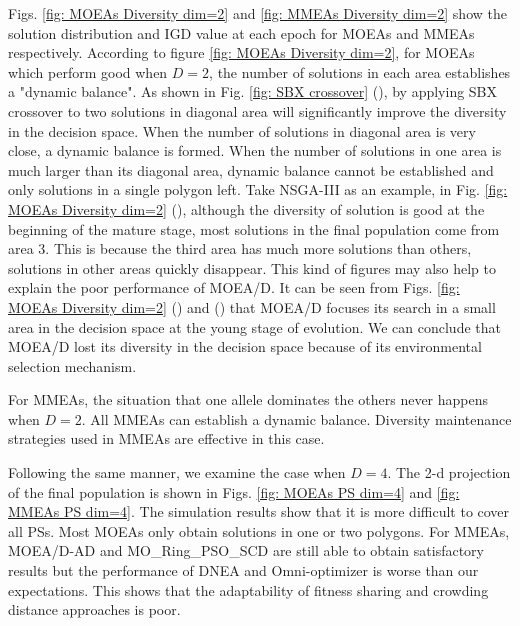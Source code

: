 \documentclass[conference]{IEEEtran}
\begin{document}
Figs. \ref{fig: MOEAs Diversity dim=2} and \ref{fig: MMEAs Diversity dim=2} show the solution distribution and IGD value at each epoch for MOEAs and MMEAs respectively. According to figure \ref{fig: MOEAs Diversity dim=2}, for MOEAs which perform good when $D=2$, the number of solutions in each area establishes a "dynamic balance". As shown in Fig. \ref{fig: SBX crossover} (), by applying SBX crossover to two solutions in diagonal area will significantly improve the diversity in the decision space. When the number of solutions in diagonal area is very close, a dynamic balance is formed. When the number of solutions in one area is much larger than its diagonal area, dynamic balance cannot be established and only solutions in a single polygon left. Take NSGA-III as an example, in Fig. \ref{fig: MOEAs Diversity dim=2} (), although the diversity of solution is good at the beginning of the mature stage, most solutions in the final population come from area 3. This is because the third area has much more solutions than others, solutions in other areas quickly disappear. This kind of figures may also help to explain the poor performance of MOEA/D. It can be seen from Figs. \ref{fig: MOEAs Diversity dim=2} () and () that MOEA/D focuses its search in a small area in the decision space at the young stage of evolution. We can conclude that MOEA/D lost its diversity in the decision space because of its environmental selection mechanism.

For MMEAs, the situation that one allele dominates the others never happens when $D=2$. All MMEAs can establish a dynamic balance. Diversity maintenance strategies used in MMEAs are effective in this case.

Following the same manner, we examine the case when $D=4$. The 2-d projection of the final population is shown in Figs. \ref{fig: MOEAs PS dim=4} and \ref{fig: MMEAs PS dim=4}. The simulation results show that it is more difficult to cover all PSs. Most MOEAs only obtain solutions in one or two polygons. For MMEAs, MOEA/D-AD and MO\_Ring\_PSO\_SCD are still able to obtain satisfactory results but the performance of DNEA and Omni-optimizer is worse than our expectations. This shows that the adaptability of fitness sharing and crowding distance approaches is poor. 
\end{document}
